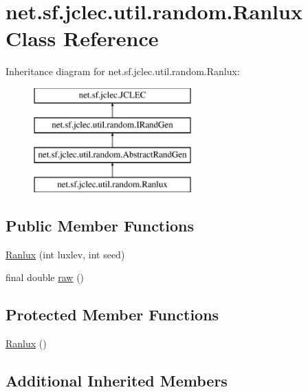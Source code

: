 \hypertarget{classnet_1_1sf_1_1jclec_1_1util_1_1random_1_1_ranlux}{\section{net.\-sf.\-jclec.\-util.\-random.\-Ranlux Class Reference}
\label{classnet_1_1sf_1_1jclec_1_1util_1_1random_1_1_ranlux}
}
Inheritance diagram for net.\-sf.\-jclec.\-util.\-random.\-Ranlux\-:\begin{figure}[H]
\begin{center}
\leavevmode
\includegraphics[height=4.000000cm]{classnet_1_1sf_1_1jclec_1_1util_1_1random_1_1_ranlux}
\end{center}
\end{figure}
\subsection*{Public Member Functions}
\begin{DoxyCompactItemize}
\item 
\hyperlink{classnet_1_1sf_1_1jclec_1_1util_1_1random_1_1_ranlux_a770a1b1cbbbaede3f6c3be720c88c284}{Ranlux} (int luxlev, int seed)
\item 
final double \hyperlink{classnet_1_1sf_1_1jclec_1_1util_1_1random_1_1_ranlux_a2a35b5c1a2a08b985c04b25ec7f8ef43}{raw} ()
\end{DoxyCompactItemize}
\subsection*{Protected Member Functions}
\begin{DoxyCompactItemize}
\item 
\hyperlink{classnet_1_1sf_1_1jclec_1_1util_1_1random_1_1_ranlux_ad4bc0fb1b59447d507ece8cc4383236e}{Ranlux} ()
\end{DoxyCompactItemize}
\subsection*{Additional Inherited Members}


